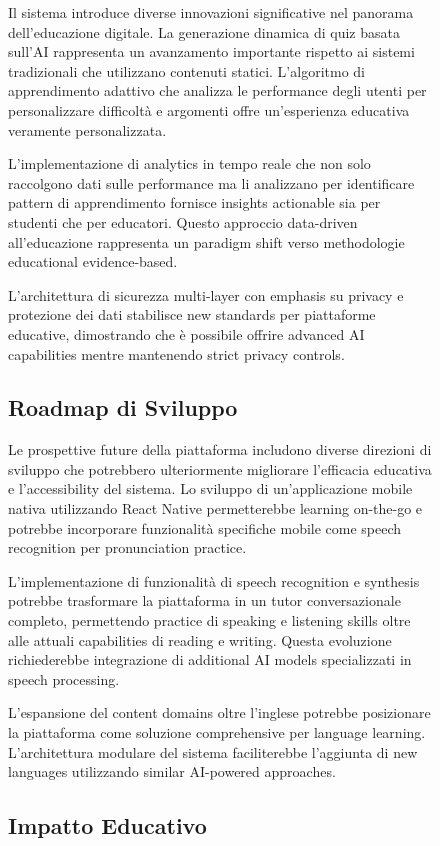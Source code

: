 \documentclass[12pt,a4paper]{article}
\begin{document}
\begin{figure}[H]
Il sistema introduce diverse innovazioni significative nel panorama dell'educazione digitale. La generazione dinamica di quiz basata sull'AI rappresenta un avanzamento importante rispetto ai sistemi tradizionali che utilizzano contenuti statici. L'algoritmo di apprendimento adattivo che analizza le performance degli utenti per personalizzare difficoltà e argomenti offre un'esperienza educativa veramente personalizzata.

L'implementazione di analytics in tempo reale che non solo raccolgono dati sulle performance ma li analizzano per identificare pattern di apprendimento fornisce insights actionable sia per studenti che per educatori. Questo approccio data-driven all'educazione rappresenta un paradigm shift verso methodologie educational evidence-based.

L'architettura di sicurezza multi-layer con emphasis su privacy e protezione dei dati stabilisce new standards per piattaforme educative, dimostrando che è possibile offrire advanced AI capabilities mentre mantenendo strict privacy controls.

\subsection{Roadmap di Sviluppo}

Le prospettive future della piattaforma includono diverse direzioni di sviluppo che potrebbero ulteriormente migliorare l'efficacia educativa e l'accessibility del sistema. Lo sviluppo di un'applicazione mobile nativa utilizzando React Native permetterebbe learning on-the-go e potrebbe incorporare funzionalità specifiche mobile come speech recognition per pronunciation practice.

L'implementazione di funzionalità di speech recognition e synthesis potrebbe trasformare la piattaforma in un tutor conversazionale completo, permettendo practice di speaking e listening skills oltre alle attuali capabilities di reading e writing. Questa evoluzione richiederebbe integrazione di additional AI models specializzati in speech processing.

L'espansione del content domains oltre l'inglese potrebbe posizionare la piattaforma come soluzione comprehensive per language learning. L'architettura modulare del sistema faciliterebbe l'aggiunta di new languages utilizzando similar AI-powered approaches.

\subsection{Impatto Educativo}


\end{figure}
\end{document}
